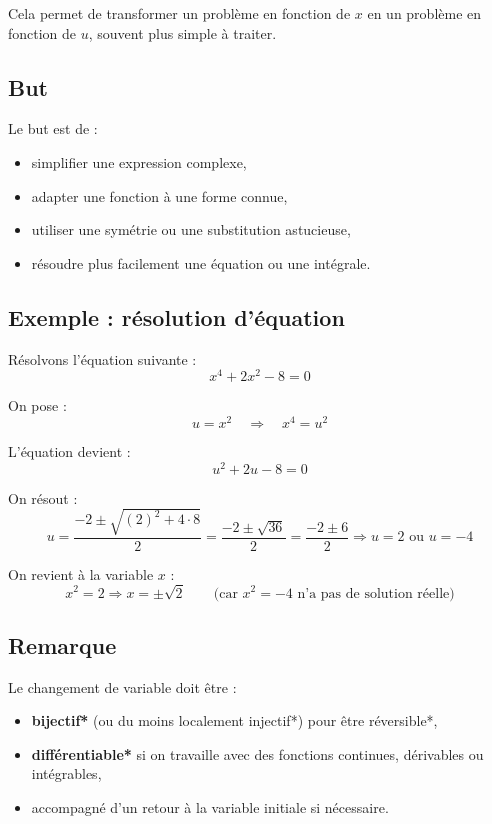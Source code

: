 \documentclass[12]{article}%
\theoremstyle{plain}
\theoremstyle{definition}
\theoremstyle{remark}
\begin{document}
Cela permet de transformer un problème en fonction de \( x \) en un problème en fonction de \( u \), souvent plus simple à traiter.

\subsection*{But}

Le but est de :
\begin{itemize}
	\item simplifier une expression complexe,
	\item adapter une fonction à une forme connue,
	\item utiliser une symétrie ou une substitution astucieuse,
	\item résoudre plus facilement une équation ou une intégrale.
\end{itemize}

\subsection*{Exemple : résolution d'équation}

Résolvons l'équation suivante :
\[
x^4 + 2x^2 - 8 = 0
\]

On pose :
\[
u = x^2 \quad \Rightarrow \quad x^4 = u^2
\]

L'équation devient :
\[
u^2 + 2u - 8 = 0
\]

On résout :
\[
u = \frac{-2 \pm \sqrt{(2)^2 + 4 \cdot 8}}{2} = \frac{-2 \pm \sqrt{36}}{2} = \frac{-2 \pm 6}{2}
\Rightarrow u = 2 \text{ ou } u = -4
\]

On revient à la variable \( x \) :
\[
x^2 = 2 \Rightarrow x = \pm \sqrt{2} \qquad \text{(car } x^2 = -4 \text{ n'a pas de solution réelle)}
\]

\subsection*{Remarque}

Le changement de variable doit être :
\begin{itemize}
	\item \textbf{bijectif*} (ou du moins localement injectif*) pour être réversible*,
	\item \textbf{différentiable*} si on travaille avec des fonctions continues, dérivables ou intégrables,
	\item accompagné d'un retour à la variable initiale si nécessaire.
\end{itemize}
\end{document}
